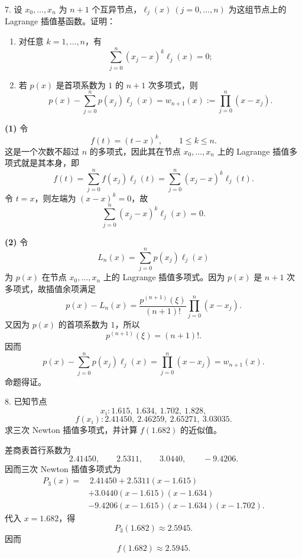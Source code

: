 \documentclass[11pt, a4paper]{ctexart}
\begin{document}
\begin{problem}{7. 设 $x_0,\ldots,x_n$ 为 $n+1$ 个互异节点，$\ell_j(x)\ (j=0,\ldots,n)$ 为这组节点上的 Lagrange 插值基函数。证明：}
    \begin{enumerate}[(1)]
        \item 对任意 $k=1,\ldots,n$，有
        \[
            \sum_{j=0}^{n}(x_j-x)^k\ell_j(x)=0;
        \]
        \item 若 $p(x)$ 是首项系数为 $1$ 的 $n+1$ 次多项式，则
        \[
            p(x)-\sum_{j=0}^{n}p(x_j)\ell_j(x)=w_{n+1}(x):=\prod_{j=0}^{n}(x-x_j).
        \]
    \end{enumerate}
\end{problem}

\begin{myproof}
    \textbf{(1)} 令
    \[
        f(t)=(t-x)^k,\qquad 1\le k\le n.
    \]
    这是一个次数不超过 $n$ 的多项式，因此其在节点 $x_0,\ldots,x_n$ 上的 Lagrange 插值多项式就是其本身，即
    \[
        f(t)=\sum_{j=0}^{n}f(x_j)\ell_j(t)
        =\sum_{j=0}^{n}(x_j-x)^k\ell_j(t).
    \]
    令 $t=x$，则左端为 $(x-x)^k=0$，故
    \[
        \sum_{j=0}^{n}(x_j-x)^k\ell_j(x)=0.
    \]

    \textbf{(2)} 令
    \[
        L_n(x)=\sum_{j=0}^{n}p(x_j)\ell_j(x)
    \]
    为 $p(x)$ 在节点 $x_0,\ldots,x_n$ 上的 Lagrange 插值多项式。因为 $p(x)$ 是 $n+1$ 次多项式，故插值余项满足
    \[
        p(x)-L_n(x)=\frac{p^{(n+1)}(\xi)}{(n+1)!}\prod_{j=0}^{n}(x-x_j).
    \]
    又因为 $p(x)$ 的首项系数为 $1$，所以
    \[
        p^{(n+1)}(\xi)=(n+1)!.
    \]
    因而
    \[
        p(x)-\sum_{j=0}^{n}p(x_j)\ell_j(x)
        =\prod_{j=0}^{n}(x-x_j)
        =w_{n+1}(x).
    \]
    命题得证。
\end{myproof}


\begin{problem}{8. 已知节点}
    \[
        x_i: 1.615,\ 1.634,\ 1.702,\ 1.828,
    \]
    \[
        f(x_i): 2.41450,\ 2.46259,\ 2.65271,\ 3.03035.
    \]
    求三次 Newton 插值多项式，并计算 $f(1.682)$ 的近似值。
\end{problem}

\begin{solution}
    差商表首行系数为
    \[
        2.41450,\qquad 2.5311,\qquad 3.0440,\qquad -9.4206.
    \]
    因而三次 Newton 插值多项式为
    \[
        \begin{aligned}
            P_3(x)=&\,2.41450+2.5311(x-1.615) \\
            &+3.0440(x-1.615)(x-1.634) \\
            &-9.4206(x-1.615)(x-1.634)(x-1.702).
        \end{aligned}
    \]
    代入 $x=1.682$，得
    \[
        P_3(1.682)\approx 2.5945.
    \]
    因而
    \[
        f(1.682)\approx 2.5945.
    \]
\end{solution}
\end{document}
